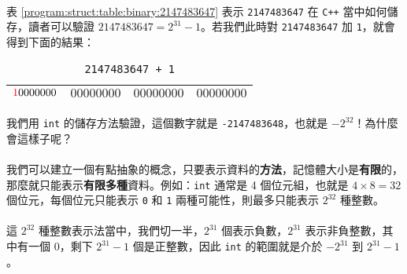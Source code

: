 \documentclass[12pt,a4paper,oneside]{article}
\begin{document}
\begin{CJK}{UTF8}{bkai}
\paragraph{}表 \ref{program:struct:table:binary:2147483647} 表示 \lstinline!2147483647! 在 \texttt{C++} 當中如何儲存，讀者可以驗證 $2147483647=2^{31}-1$。若我們此時對 \lstinline!2147483647! 加 \lstinline!1!，就會得到下面的結果：

\begin{table}[h!]
\centering
\begin{tabular}{|c|c|c|c|}
\hline
${\color{red}1}0000000$ & $00000000$ & $00000000$ & $00000000$\\
\hline
\end{tabular}
\caption{\lstinline!2147483647 + 1!}
\end{table}

\paragraph{}我們用 \lstinline!int! 的儲存方法驗證，這個數字就是 \lstinline!-2147483648!，也就是 $-2^{32}$！為什麼會這樣子呢？
\paragraph{}我們可以建立一個有點抽象的概念，只要表示資料的\textbf{方法}，記憶體大小是\textbf{有限}的，那麼就只能表示\textbf{有限多種}資料。例如：\lstinline!int! 通常是 4 個位元組，也就是 $4\times{8}=32$ 個位元，每個位元只能表示 \lstinline!0! 和 \lstinline!1! 兩種可能性，則最多只能表示 $2^{32}$ 種整數。
\paragraph{}這 $2^{32}$ 種整數表示法當中，我們切一半，$2^{31}$ 個表示負數，$2^{31}$ 表示非負整數，其中有一個 $0$，剩下 $2^{31}-1$ 個是正整數，因此 \lstinline!int! 的範圍就是介於 $-2^{31}$ 到 $2^{31}-1$。


\end{CJK}
\end{document}
